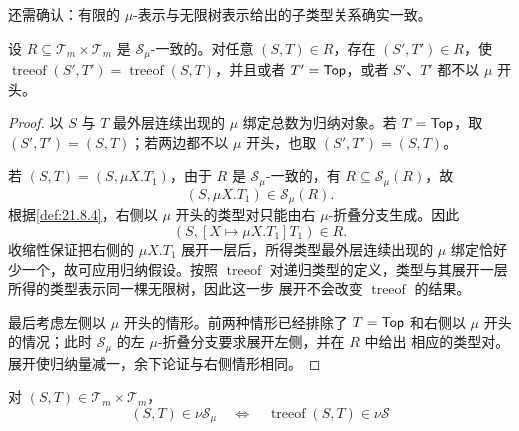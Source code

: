 还需确认：有限的 \(\mu\)-表示与无限树表示给出的子类型关系确实一致。

\begin{lemma}
\label{lem:21.8.6}
设 \(R\subseteq\mathcal T_m\times\mathcal T_m\) 是
\(\mathcal S_\mu\)-一致的。对任意 \((S,T)\in R\)，存在
\((S',T')\in R\)，使
\(\operatorname{treeof}(S',T')=\operatorname{treeof}(S,T)\)，并且或者
\(T'=\mathsf{Top}\)，或者 \(S'\)、\(T'\) 都不以 \(\mu\) 开头。
\end{lemma}

\begin{proof}
以 \(S\) 与 \(T\) 最外层连续出现的 \(\mu\) 绑定总数为归纳对象。若
\(T=\mathsf{Top}\)，取 \((S',T')=(S,T)\)；若两边都不以 \(\mu\)
开头，也取 \((S',T')=(S,T)\)。

若 \((S,T)=(S,\mu X.T_1)\)，由于 \(R\) 是
\(\mathcal S_\mu\)-一致的，有 \(R\subseteq\mathcal S_\mu(R)\)，故
\[
(S,\mu X.T_1)\in\mathcal S_\mu(R).
\]
根据\cref{def:21.8.4}，右侧以 \(\mu\) 开头的类型对只能由右
\(\mu\)-折叠分支生成。因此
\[
(S,[X\mapsto\mu X.T_1]T_1)\in R.
\]
收缩性保证把右侧的 \(\mu X.T_1\) 展开一层后，所得类型最外层连续出现的
\(\mu\) 绑定恰好少一个，故可应用归纳假设。按照 \(\operatorname{treeof}\)
对递归类型的定义，类型与其展开一层所得的类型表示同一棵无限树，因此这一步
展开不会改变 \(\operatorname{treeof}\) 的结果。

最后考虑左侧以 \(\mu\) 开头的情形。前两种情形已经排除了
\(T=\mathsf{Top}\) 和右侧以 \(\mu\) 开头的情况；此时
\(\mathcal S_\mu\) 的左 \(\mu\)-折叠分支要求展开左侧，并在 \(R\) 中给出
相应的类型对。展开使归纳量减一，余下论证与右侧情形相同。
\end{proof}


\begin{theorem}
\label{thm:21.8.7}
对 \((S,T)\in\mathcal T_m\times\mathcal T_m\)，
\[
(S,T)\in\nu\mathcal S_\mu
\quad\Longleftrightarrow\quad
\operatorname{treeof}(S,T)\in\nu\mathcal S
\]
\end{theorem}

